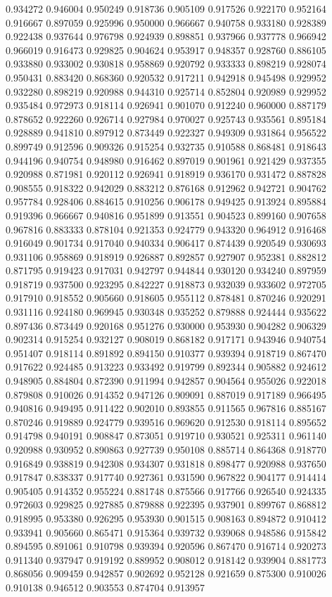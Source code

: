 0.934272
0.946004
0.950249
0.918736
0.905109
0.917526
0.922170
0.952164
0.916667
0.897059
0.925996
0.950000
0.966667
0.940758
0.933180
0.928389
0.922438
0.937644
0.976798
0.924939
0.898851
0.937966
0.937778
0.966942
0.966019
0.916473
0.929825
0.904624
0.953917
0.948357
0.928760
0.886105
0.933880
0.933002
0.930818
0.958869
0.920792
0.933333
0.898219
0.928074
0.950431
0.883420
0.868360
0.920532
0.917211
0.942918
0.945498
0.929952
0.932280
0.898219
0.920988
0.944310
0.925714
0.852804
0.920989
0.929952
0.935484
0.972973
0.918114
0.926941
0.901070
0.912240
0.960000
0.887179
0.878652
0.922260
0.926714
0.927984
0.970027
0.925743
0.935561
0.895184
0.928889
0.941810
0.897912
0.873449
0.922327
0.949309
0.931864
0.956522
0.899749
0.912596
0.909326
0.915254
0.932735
0.910588
0.868481
0.918643
0.944196
0.940754
0.948980
0.916462
0.897019
0.901961
0.921429
0.937355
0.920988
0.871981
0.920112
0.926941
0.918919
0.936170
0.931472
0.887828
0.908555
0.918322
0.942029
0.883212
0.876168
0.912962
0.942721
0.904762
0.957784
0.928406
0.884615
0.910256
0.906178
0.949425
0.913924
0.895884
0.919396
0.966667
0.940816
0.951899
0.913551
0.904523
0.899160
0.907658
0.967816
0.883333
0.878104
0.921353
0.924779
0.943320
0.964912
0.916468
0.916049
0.901734
0.917040
0.940334
0.906417
0.874439
0.920549
0.930693
0.931106
0.958869
0.918919
0.926887
0.892857
0.927907
0.952381
0.882812
0.871795
0.919423
0.917031
0.942797
0.944844
0.930120
0.934240
0.897959
0.918719
0.937500
0.923295
0.842227
0.918873
0.932039
0.933602
0.972705
0.917910
0.918552
0.905660
0.918605
0.955112
0.878481
0.870246
0.920291
0.931116
0.924180
0.969945
0.930348
0.935252
0.879888
0.924444
0.935622
0.897436
0.873449
0.920168
0.951276
0.930000
0.953930
0.904282
0.906329
0.902314
0.915254
0.932127
0.908019
0.868182
0.917171
0.943946
0.940754
0.951407
0.918114
0.891892
0.894150
0.910377
0.939394
0.918719
0.867470
0.917622
0.924485
0.913223
0.933492
0.919799
0.892344
0.905882
0.924612
0.948905
0.884804
0.872390
0.911994
0.942857
0.904564
0.955026
0.922018
0.879808
0.910026
0.914352
0.947126
0.909091
0.887019
0.917189
0.966495
0.940816
0.949495
0.911422
0.902010
0.893855
0.911565
0.967816
0.885167
0.870246
0.919889
0.924779
0.939516
0.969620
0.912530
0.918114
0.895652
0.914798
0.940191
0.908847
0.873051
0.919710
0.930521
0.925311
0.961140
0.920988
0.930952
0.890863
0.927739
0.950108
0.885714
0.864368
0.918770
0.916849
0.938819
0.942308
0.934307
0.931818
0.898477
0.920988
0.937650
0.917847
0.838337
0.917740
0.927361
0.931590
0.967822
0.904177
0.914414
0.905405
0.914352
0.955224
0.881748
0.875566
0.917766
0.926540
0.924335
0.972603
0.929825
0.927885
0.879888
0.922395
0.937901
0.899767
0.868812
0.918995
0.953380
0.926295
0.953930
0.901515
0.908163
0.894872
0.910412
0.933941
0.905660
0.865471
0.915364
0.939732
0.939068
0.948586
0.915842
0.894595
0.891061
0.910798
0.939394
0.920596
0.867470
0.916714
0.920273
0.911340
0.937947
0.919192
0.889952
0.908012
0.918142
0.939904
0.881773
0.868056
0.909459
0.942857
0.902692
0.952128
0.921659
0.875300
0.910026
0.910138
0.946512
0.903553
0.874704
0.913957
